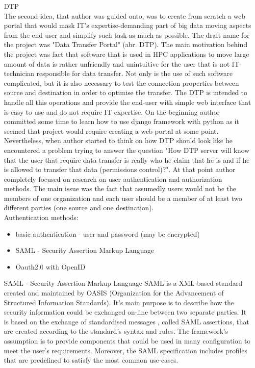 \documentclass[magisterska,en]{pracamgr}
\begin{document}
\newpage
DTP\\
The second idea, that author was guided onto, was to create from scratch a web portal that would mask IT's expertise-demanding part of big data moving aspects from the end user and simplify such task as much as possible. The draft name for the project was "Data Transfer Portal" (abr. DTP). The main motivation behind the project was fact that software that is used in HPC applications to move large amount of data is rather unfriendly and unintuitive for the user that is not IT-technician responsible for data transfer. Not only is the use of such software complicated, but it is also necessary to test the connection properties between source and destination in order to optimise the transfer. The DTP is intended to handle all this operations and provide the end-user with simple web interface that is easy to use and do not require IT expertise.
On the beginning author committed some time to learn how to use django framework with python \cite{djangotutorial} as it seemed that project would require creating a web portal at some point. 
Nevertheless, when author started to think on how DTP should look like he encountered a problem trying to answer the question "How DTP server will know that the user that require data transfer is really who he claim that he is and if he is allowed to transfer that data (permissions control)?". At that point author completely focused on research on user authentication and authorization methods. The main issue was the fact that assumedly users would not be the members of one organization and each user should be a member of at least two different parties (one source and one destination).\\

Authentication methods:\cite{auth_meth}

\begin{itemize}
 \item basic authentication - user and password (may be encrypted)
 \item SAML - Security Assertion Markup Language\cite{saml2}
 \item Oauth2.0\cite{OAuth2} with OpenID\cite{OpenID}
\end{itemize}


SAML - Security Assertion Markup Language
SAML is a XML-based standard created and maintained by OASIS (Organization for the Advancement of Structured Information Standards). It's main purpose is to describe how the security information could be exchanged on-line between two separate parties. It is based on the exchange of standardised messages , called SAML assertions, that are created according to the standard's syntax and rules. The framework's assumption is to provide components that could be used in many configuration to meet the user's requirements. Moreover, the SAML specification includes profiles that are predefined to satisfy the most common use-cases.\cite{saml2}\\
\end{document}
